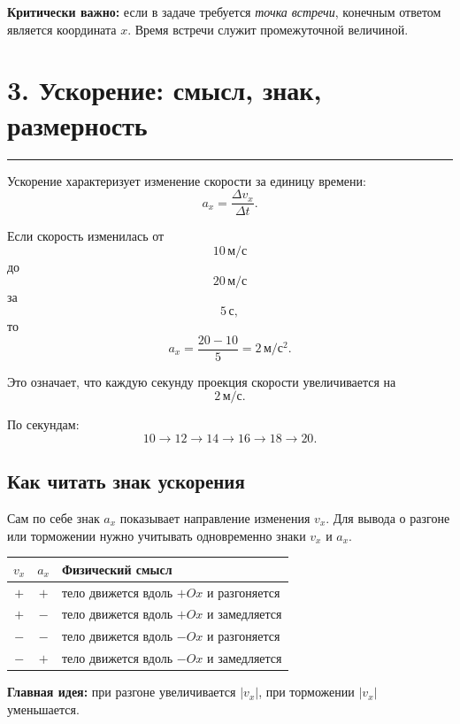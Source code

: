 \documentclass[a4paper,12pt]{article}
\newcommand{\sectionline}{%
  \par\vspace{-0.5em}%
  \noindent\textcolor{accent}{\rule{\linewidth}{0.7pt}}%
  \par\vspace{0.5em}%
}
\newcommand{\key}[1]{\textcolor{darkaccent}{\textbf{#1}}}
\begin{document}
\key{Критически важно:}
если в задаче требуется \emph{точка встречи}, конечным ответом является координата \(x\). Время встречи служит промежуточной величиной.


\section*{3. Ускорение: смысл, знак, размерность}
\sectionline

Ускорение характеризует изменение скорости за единицу времени:
\[
  a_x=\frac{\Delta v_x}{\Delta t}.
\]

Если скорость изменилась от
\[
  10\,\text{м}/\text{с}
\]
до
\[
  20\,\text{м}/\text{с}
\]
за
\[
  5\,\text{с},
\]
то
\[
  a_x=
  \frac{20-10}{5}
  =
  2\,\text{м}/\text{с}^2.
\]

Это означает, что каждую секунду проекция скорости увеличивается на
\[
  2\,\text{м}/\text{с}.
\]

По секундам:
\[
  10\to12\to14\to16\to18\to20.
\]

\subsection*{Как читать знак ускорения}

Сам по себе знак \(a_x\) показывает направление изменения \(v_x\).
Для вывода о разгоне или торможении нужно учитывать одновременно знаки \(v_x\) и \(a_x\).

\begin{center}
\begin{tabularx}{\linewidth}{@{}c c X@{}}
\toprule
\(v_x\) & \(a_x\) & Физический смысл \\
\midrule
\(+\) & \(+\) &
тело движется вдоль \(+Ox\) и разгоняется \\
\(+\) & \(-\) &
тело движется вдоль \(+Ox\) и замедляется \\
\(-\) & \(-\) &
тело движется вдоль \(-Ox\) и разгоняется \\
\(-\) & \(+\) &
тело движется вдоль \(-Ox\) и замедляется \\
\bottomrule
\end{tabularx}
\end{center}

\key{Главная идея:}
при разгоне увеличивается \(|v_x|\), при торможении \(|v_x|\) уменьшается.

\end{document}
